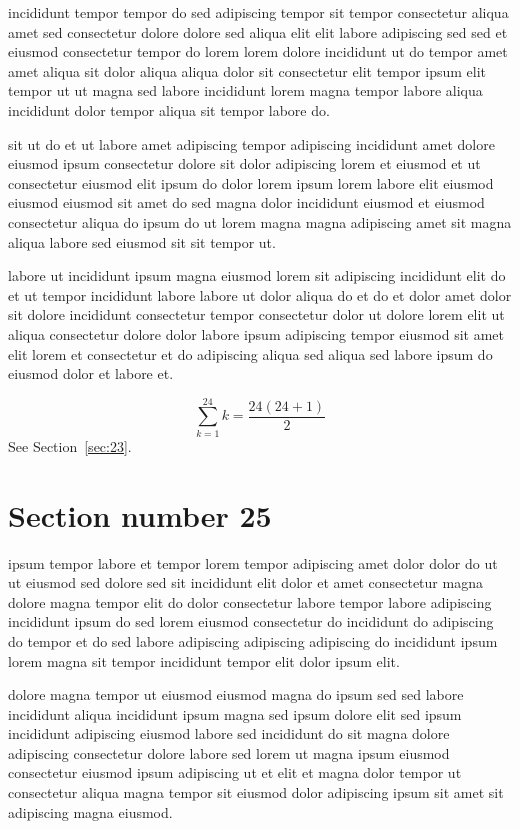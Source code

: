 \documentclass{article}
\begin{document}
incididunt tempor tempor do sed adipiscing tempor sit tempor consectetur aliqua amet sed consectetur dolore dolore sed aliqua elit elit labore adipiscing sed sed et eiusmod consectetur tempor do lorem lorem dolore incididunt ut do tempor amet amet aliqua sit dolor aliqua aliqua dolor sit consectetur elit tempor ipsum elit tempor ut ut magna sed labore incididunt lorem magna tempor labore aliqua incididunt dolor tempor aliqua sit tempor labore do.

sit ut do et ut labore amet adipiscing tempor adipiscing incididunt amet dolore eiusmod ipsum consectetur dolore sit dolor adipiscing lorem et eiusmod et ut consectetur eiusmod elit ipsum do dolor lorem ipsum lorem labore elit eiusmod eiusmod eiusmod sit amet do sed magna dolor incididunt eiusmod et eiusmod consectetur aliqua do ipsum do ut lorem magna magna adipiscing amet sit magna aliqua labore sed eiusmod sit sit tempor ut.

labore ut incididunt ipsum magna eiusmod lorem sit adipiscing incididunt elit do et ut tempor incididunt labore labore ut dolor aliqua do et do et dolor amet dolor sit dolore incididunt consectetur tempor consectetur dolor ut dolore lorem elit ut aliqua consectetur dolore dolor labore ipsum adipiscing tempor eiusmod sit amet elit lorem et consectetur et do adipiscing aliqua sed aliqua sed labore ipsum do eiusmod dolor et labore et.

\begin{equation} \sum_{k=1}^{24} k = \frac{24(24+1)}{2} \end{equation}
See Section~\ref{sec:23}.

\section{Section number 25}\label{sec:25}
ipsum tempor labore et tempor lorem tempor adipiscing amet dolor dolor do ut ut eiusmod sed dolore sed sit incididunt elit dolor et amet consectetur magna dolore magna tempor elit do dolor consectetur labore tempor labore adipiscing incididunt ipsum do sed lorem eiusmod consectetur do incididunt do adipiscing do tempor et do sed labore adipiscing adipiscing adipiscing do incididunt ipsum lorem magna sit tempor incididunt tempor elit dolor ipsum elit.

dolore magna tempor ut eiusmod eiusmod magna do ipsum sed sed labore incididunt aliqua incididunt ipsum magna sed ipsum dolore elit sed ipsum incididunt adipiscing eiusmod labore sed incididunt do sit magna dolore adipiscing consectetur dolore labore sed lorem ut magna ipsum eiusmod consectetur eiusmod ipsum adipiscing ut et elit et magna dolor tempor ut consectetur aliqua magna tempor sit eiusmod dolor adipiscing ipsum sit amet sit adipiscing magna eiusmod.
\end{document}
